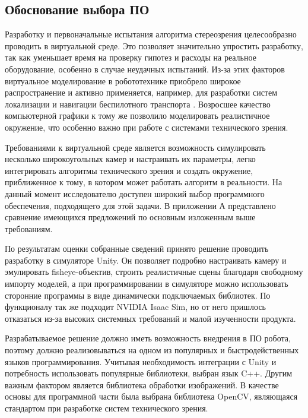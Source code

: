 \subsection{Обоснование выбора ПО}
\label{sec:software}
Разработку и первоначальные испытания алгоритма стереозрения целесообразно проводить в виртуальной среде. Это позволяет значительно упростить разработку, 
так как уменьшает время на проверку гипотез и расходы на реальное оборудование, особенно в случае неудачных испытаний. Из-за этих факторов виртуальное моделирование 
в робототехнике приобрело широкое распространение и активно применяется, например, для разработки систем локализации и навигации беспилотного транспорта \cite{simulations}. 
Возросшее качество компьютерной графики к тому же позволило моделировать реалистичное окружение, что особенно важно при работе с системами технического зрения. 

Требованиями к виртуальной среде является возможность симулировать несколько широкоугольных камер и настраивать их параметры, 
легко интегрировать алгоритмы технического зрения и создать окружение, приближенное к тому, в котором может работать алгоритм в реальности. На данный момент исследователю доступен 
широкий выбор программного обеспечения, подходящего для этой задачи. В приложении А представлено сравнение имеющихся предложений по основным изложенным выше 
требованиям.


По результатам оценки собранные сведений принято решение проводить разработку в симуляторе Unity. Он позволяет подробно настраивать камеру и эмулировать fisheye-объектив, 
строить реалистичные сцены благодаря свободному импорту моделей, а при программировании в симуляторе можно использовать сторонние программы в виде динамически подключаемых библиотек. 
По функционалу так же подходит NVIDIA Isaac Sim, но от него пришлось отказаться из-за высоких системных требований и малой изученности продукта.     %

Разрабатываемое решение должно иметь возможность внедрения в ПО робота, %
поэтому должно реализовываться на одном из популярных и быстродейственных языков программирования. Учитывая необходимость интеграции с Unity и потребность использовать популярные 
библиотеки, выбран язык C++.  Другим важным фактором является библиотека обработки изображений. В качестве основы для программной части была выбрана библиотека OpenCV, являющаяся стандартом 
при разработке систем технического зрения. 